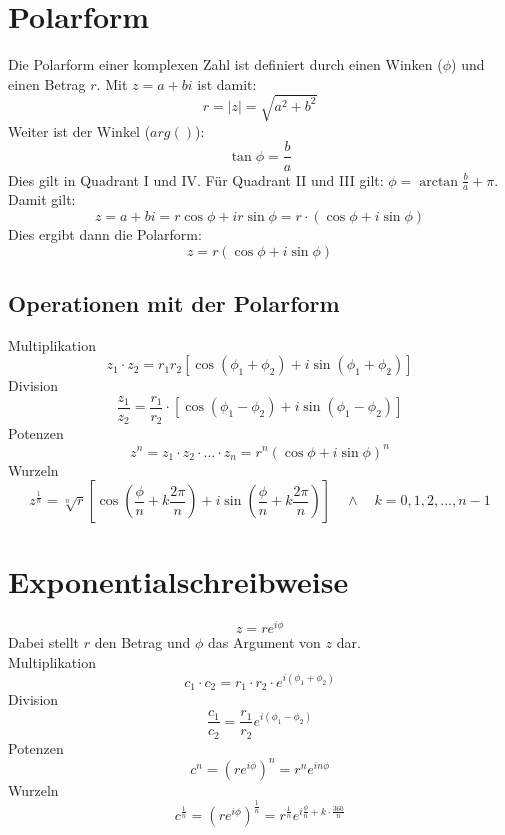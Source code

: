 \documentclass{report}
\begin{document}
\section{Polarform}
Die Polarform einer komplexen Zahl ist definiert durch einen Winken ($\phi$) und einen Betrag $r$. Mit $z = a + bi$ ist damit:
\begin{equation}r = |z| = \sqrt{a^2 + b^2}\end{equation}
Weiter ist der Winkel ($arg()$):
\begin{equation}\tan{\phi} = \frac{b}{a}\end{equation}
Dies gilt in Quadrant I und IV. Für Quadrant II und III gilt: $\phi = \arctan{\frac{b}{a}+\pi}$.\\
Damit gilt:
\begin{equation}z = a + bi = r \cos{\phi} + i r \sin{\phi} = r \cdot (\cos{\phi} + i \sin{\phi})\end{equation}
Dies ergibt dann die Polarform:
\begin{equation}z = r (\cos{\phi} + i \sin{\phi})\end{equation}
\subsection{Operationen mit der Polarform}
Multiplikation
\begin{equation}z_1 \cdot z_2 = r_1r_2[\cos{(\phi_1 + \phi_2)} + i \sin{(\phi_1 + \phi_2)}]\end{equation}
Division
\begin{equation}\frac{z_1}{z_2} = \frac{r_1}{r_2} \cdot [\cos{(\phi_1 - \phi_2)} + i \sin{(\phi_1 - \phi_2)}]\end{equation}
Potenzen
\begin{equation}z^n = z_1 \cdot z_2 \cdot ... \cdot z_n = r^n (\cos{\phi} + i \sin{\phi})^n\end{equation}
Wurzeln
\begin{equation}z^{\frac{1}{n}} = \sqrt[n]{r}[\cos{(\frac{\phi}{n} + k\frac{2\pi}{n})} + i \sin{(\frac{\phi}{n} + k\frac{2\pi}{n})}] \quad \land \quad k = 0,1,2,...,n-1\end{equation}
\section{Exponentialschreibweise}
\begin{equation}z= r e^{i \phi}\end{equation}
Dabei stellt $r$ den Betrag und $\phi$ das Argument von $z$ dar.\\
Multiplikation
\begin{equation}c_1 \cdot c_2 = r_1 \cdot r_2 \cdot e^{i(\phi_1 + \phi_2)}\end{equation}
Division
\begin{equation}\frac{c_1}{c_2} = \frac{r_1}{r_2} e^{i(\phi_1 - \phi_2)}\end{equation}
Potenzen
\begin{equation}c^n = (r e^{i \phi})^n = r^n e^{i n \phi}\end{equation}
Wurzeln
\begin{equation}c^{\frac{1}{n}} = (r e^{i \phi})^{\frac{1}{n}} = r^{\frac{1}{n}}e^{i \frac{\phi}{n} + k \cdot \frac{360}{n}}\end{equation}
\end{document}
